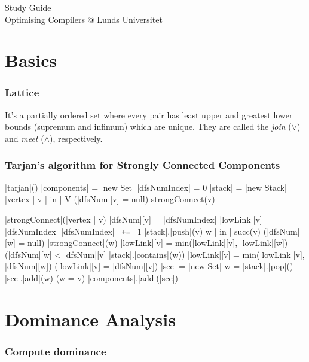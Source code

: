 \documentclass[a4paper,12pt, notitlepage]{article}
\newcommand{\negv}{\vspace{-0.7cm}}
\begin{document}
\begin{center}

{\Large{Study Guide\\ \bigskip
			Optimising Compilers @ Lunds Universitet}}
\vspace{1cm}
\end{center}
\section*{Basics}
\subsubsection*{Lattice}
It's a partially ordered set where every pair has least upper and greatest lower
bounds (supremum and infimum) which are unique. They are called the
\textit{join} ($\lor$) and \textit{meet} ($\land$), respectively.

\subsubsection*{Tarjan's algorithm for Strongly Connected Components}
\negv
\begin{program}
\PROC |tarjan|() \BODY
    |components| = |new Set|
    |dfsNumIndex| = 0
    |stack| = |new Stack|
    \FOREACH |vertex | v | in | V \DO
        \IF (|dfsNum|[v] = null) \AR*
            strongConnect(v)
        \FI \OD
\end{program} \negv
\begin{program}
\PROC |strongConnect|(|vertex | v) \BODY
    |dfsNum|[v] = |dfsNumIndex|
    |lowLink|[v] = |dfsNumIndex|
    |dfsNumIndex| \texttt{ += } 1
    |stack|.|push|(v)
    \FOREACH w | in | succ(v) \DO
        \IF (|dfsNum|[w] = null) \AR*
            |strongConnect|(w)
            |lowLink|[v] = min(|lowLink|[v], |lowLink|[w])
        \ELSIF (|dfsNum|[w] < |dfsNum|[v] \land |stack|.|contains|(w)) \AR*
            |lowLink|[v] = min(|lowLink|[v], |dfsNum|[w]) \FI
    \OD
    \IF (|lowLink|[v] = |dfsNum|[v]) \AR*
        |scc| = |new Set|
        \DOW
            w = |stack|.|pop|()
            |scc|.|add|(w)
        \ODW (w \not= v)
        |components|.|add|(|scc|)
    \FI
\end{program}

\section*{Dominance Analysis}
\subsubsection*{Compute dominance}
\end{document}

